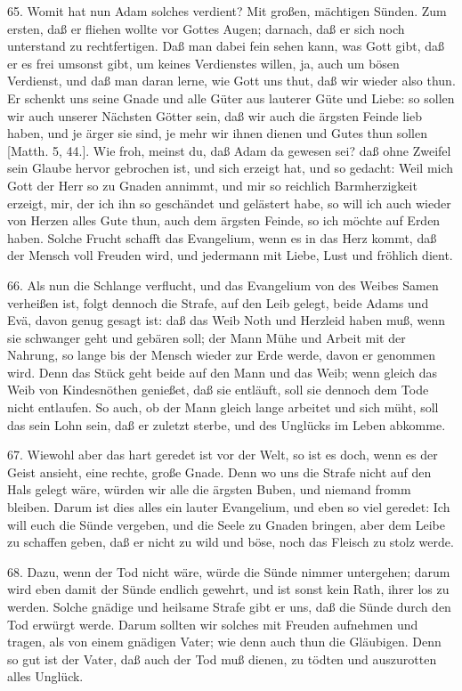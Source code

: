 65. Womit hat nun Adam solches verdient? Mit großen, mächtigen Sünden. Zum ersten,
daß er fliehen wollte vor Gottes Augen; darnach, daß er sich noch unterstand zu rechtfertigen. Daß man dabei fein sehen kann, was Gott gibt, daß er es frei umsonst gibt, um keines Verdienstes willen, ja, auch um bösen Verdienst, und daß man daran lerne, wie Gott uns thut, daß wir wieder also thun. Er schenkt uns seine Gnade und alle Güter aus lauterer Güte und Liebe: so sollen wir auch unserer Nächsten Götter sein, daß wir auch die ärgsten Feinde lieb haben, und je ärger sie sind, je mehr wir ihnen dienen und Gutes thun sollen [Matth. 5, 44.]. Wie froh, meinst du, daß Adam da gewesen sei? daß ohne Zweifel sein Glaube hervor gebrochen ist, und sich erzeigt hat, und so gedacht: Weil mich Gott der Herr so zu Gnaden annimmt, und mir so reichlich Barmherzigkeit erzeigt, mir, der ich ihn so geschändet und gelästert habe, so will ich auch wieder von Herzen alles Gute thun, auch dem ärgsten Feinde, so ich möchte auf Erden haben. Solche Frucht schafft das Evangelium, wenn es in das Herz kommt, daß der Mensch voll Freuden wird, und jedermann mit Liebe, Lust und fröhlich dient.

66. Als nun die Schlange verflucht, und das Evangelium von des Weibes Samen verheißen ist, folgt dennoch die Strafe, auf den Leib gelegt, beide Adams und Evä, davon genug gesagt ist: daß das Weib Noth und Herzleid haben muß, wenn sie schwanger geht und gebären soll; der Mann Mühe und Arbeit mit der Nahrung, so lange bis der Mensch wieder zur Erde werde, davon er genommen wird. Denn das Stück geht beide auf den Mann und das Weib; wenn gleich das Weib von Kindesnöthen genießet, daß sie entläuft, soll sie dennoch dem Tode nicht entlaufen. So auch, ob der Mann gleich lange arbeitet und sich müht, soll das sein Lohn sein, daß er zuletzt sterbe, und des Unglücks im Leben abkomme.

67. Wiewohl aber das hart geredet ist vor der Welt, so ist es doch, wenn es der Geist ansieht, eine rechte, große Gnade. Denn wo uns die Strafe nicht auf den Hals gelegt wäre, würden wir alle die ärgsten Buben, und niemand fromm bleiben. Darum ist dies alles ein lauter Evangelium, und eben so viel geredet: Ich will euch die Sünde vergeben, und die Seele zu Gnaden bringen, aber dem Leibe zu schaffen geben, daß er nicht zu wild und böse, noch das Fleisch zu stolz werde.

68. Dazu, wenn der Tod nicht wäre, würde die Sünde nimmer untergehen; darum wird eben damit der Sünde endlich gewehrt, und ist sonst kein Rath, ihrer los zu werden. Solche gnädige und heilsame Strafe gibt er uns, daß die Sünde durch den Tod erwürgt werde. Darum sollten wir solches mit Freuden aufnehmen und tragen, als von einem gnädigen Vater; wie denn auch thun die Gläubigen. Denn so gut ist der Vater, daß auch der Tod muß dienen, zu tödten und auszurotten alles Unglück.

